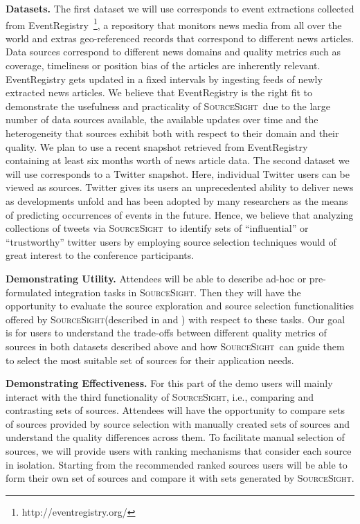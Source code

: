 \documentclass{vldb}
\newcommand\system{\textsc{SourceSight}}
\begin{document}
\vspace{2pt}\noindent\textbf{Datasets.} The first dataset we will use corresponds to event extractions collected from EventRegistry~\footnote{http://eventregistry.org/}, a repository that monitors news media from all over the world and extras geo-referenced records that correspond to different news articles. Data sources correspond to different news domains and quality metrics such as coverage, timeliness or position bias of the articles are inherently relevant. EventRegistry gets updated in a fixed intervals  by ingesting feeds of newly extracted news articles. We believe that EventRegistry is the right fit to demonstrate the usefulness and practicality of \system~due to the large number of data sources available, the available updates over time and the heterogeneity that sources exhibit both with respect to their domain and their quality. We plan to use a recent snapshot retrieved from EventRegistry containing at least six months worth of news article data. The second dataset we will use corresponds to a Twitter snapshot. Here, individual Twitter users can be viewed as sources. Twitter gives its users an unprecedented ability to deliver news as developments unfold and has been adopted by many researchers as the means of predicting occurrences of events in the future. Hence, we believe that analyzing collections of tweets via \system~to identify sets of ``influential'' or ``trustworthy'' twitter users by employing source selection techniques would of great interest to the conference participants.

\vspace{2pt}\noindent\textbf{Demonstrating Utility.} Attendees will be able to describe ad-hoc or pre-formulated integration tasks in \system. Then they will have the opportunity to evaluate the source exploration and source selection functionalities offered by \system (described in  and ) with respect to these tasks. Our goal is for users to understand the trade-offs between different quality metrics of sources in both datasets described above and how \system~can guide them to select the most suitable set of sources for their application needs.

\vspace{2pt}\noindent\textbf{Demonstrating Effectiveness.} For this part of the demo users will mainly interact with the third functionality of \system, i.e., comparing and contrasting sets of sources. Attendees will have the opportunity to compare sets of sources provided by source selection with manually created sets of sources and understand the quality differences across them. To facilitate manual selection of sources, we will provide users with ranking mechanisms that consider each source in isolation. Starting from the recommended ranked sources users will be able to form their own set of sources and compare it with sets generated by \system. 
\end{document}
